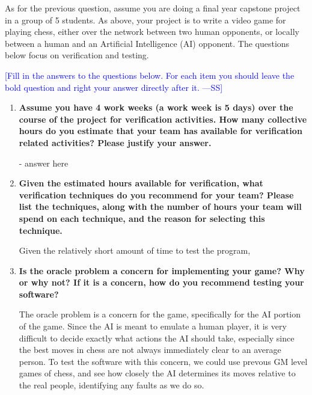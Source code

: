 \documentclass[12pt,fleqn]{examtst}
\newcommand{\authornote}[3]{\textcolor{#1}{[#3 ---#2]}}
\newcommand{\authornote}[3]{}
\newcommand{\wss}[1]{\authornote{blue}{SS}{#1}}
\begin{document}

\newpage

 As for the previous question, assume you are doing a final
year capstone project in a group of 5 students.  As above, your project
is to write a video game for playing chess, either over the network between two
human opponents, or locally between a human and an Artificial Intelligence
(AI) opponent.  The questions below focus on verification and testing.

\bigskip

\noindent \wss{Fill in the answers to the questions below.  For each item you
  should leave the bold question and right your answer directly after it.}

\begin{enumerate}
\item \textbf{Assume you have 4 work weeks (a work week is 5 days) over the
    course of the project for verification activities.  How many collective
    hours do you estimate that your team has available for verification related
    activities?  Please justify your answer.}

  - answer here
  
\item \textbf{Given the estimated hours available for verification, what verification
    techniques do you recommend for your team?  Please list the techniques,
    along with the number of hours your team will spend on each technique, and
    the reason for selecting this technique.}

Given the relatively short amount of time to test the program, 
  
\item \textbf{Is the oracle problem a concern for implementing your game?  Why
    or why not?  If it is a concern, how do you recommend testing your software?}

The oracle problem is a concern for the game, specifically for the AI portion of the game. Since the AI is meant to emulate a human player, it is very difficult to decide exactly what actions the AI should take, especially since the best moves in chess are not always immediately clear to an average person. To test the software with this concern, we could use prevous GM level games of chess, and see how closely the AI determines its moves relative to the real people, identifying any faults as we do so.
    
\end{enumerate}
\end{document}
